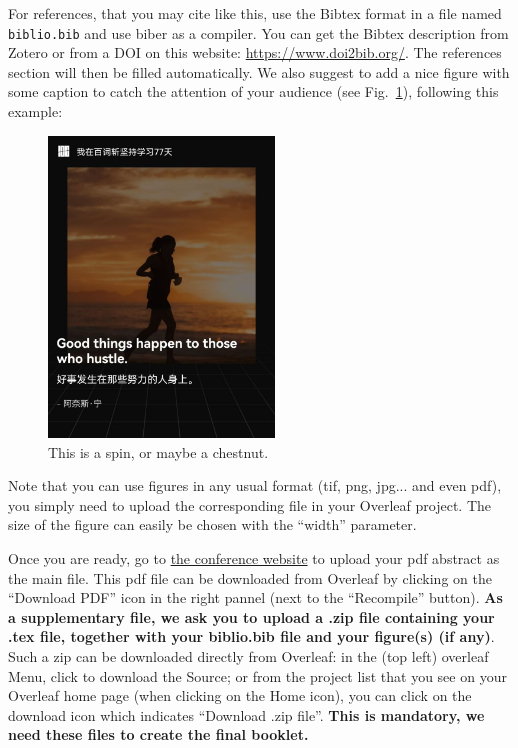 \documentclass[a4paper, 10pt]{article}
\begin{document}
\begin{CJK}{UTF8}{gbsn}
	For references, that you may cite like this\cite{wolfSpintronicsSpinBasedElectronics2001}, use the Bibtex format in a file named \texttt{biblio.bib} and use biber as a compiler. You can get the Bibtex description from Zotero or from a DOI on this website: \url{https://www.doi2bib.org/}.  The references section will then be filled automatically. We also suggest to add a nice figure with some caption to catch the attention of your audience (see Fig.~\ref{fig:spin}), following this example:
	\begin{figure}[h]
		\centering
		\includegraphics[width=6cm]{111.jpg}
		\caption{This is a spin, or maybe a chestnut.}
		\label{fig:spin}
	\end{figure}
	
	Note that you can use figures in any usual format (tif, png, jpg... and even pdf), you simply need to upload the corresponding file in your Overleaf project. The size of the figure can easily be chosen with the ``width'' parameter.
	
	Once you are ready, go to \href{https://cln2025.sciencesconf.org/}{the conference website} to upload your pdf abstract as the main file. This pdf file can be downloaded from Overleaf by clicking on the ``Download PDF'' icon in the right pannel (next to the ``Recompile'' button). \textbf{As a supplementary file, we ask you to upload a .zip file containing your .tex file, together with your biblio.bib file and your figure(s) (if any)}. Such a zip can be downloaded directly from Overleaf: in the (top left) overleaf Menu, click to download the Source; or from the project list that you see on your Overleaf home page (when clicking on the Home icon), you can click on the download icon which indicates ``Download .zip file''. \textbf{\textcolor{Firebrick1}{This is mandatory, we need these files to create the final booklet.}}
	

\end{CJK}
\end{document}
